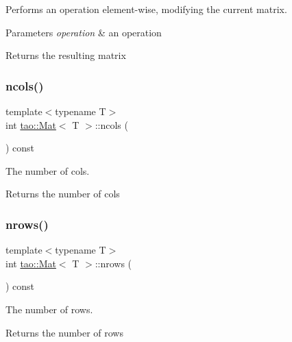 Performs an operation element-\/wise, modifying the current matrix. 


\begin{DoxyParams}{Parameters}
{\em operation} & an operation \\
\hline
\end{DoxyParams}
\begin{DoxyReturn}{Returns}
the resulting matrix 
\end{DoxyReturn}
\mbox{\label{classtao_1_1_mat_ae13a111423bb288f81a3c2ff132955f7}} 
\subsubsection{\texorpdfstring{ncols()}{ncols()}}
{\footnotesize\ttfamily template$<$typename T$>$ \\
int \mbox{\hyperlink{classtao_1_1_mat}{tao\+::\+Mat}}$<$ T $>$\+::ncols (\begin{DoxyParamCaption}{ }\end{DoxyParamCaption}) const\hspace{0.3cm}{\ttfamily [inline]}}



The number of cols. 

\begin{DoxyReturn}{Returns}
the number of cols 
\end{DoxyReturn}
\mbox{\label{classtao_1_1_mat_a6391b9b7e8b36ceeb341e8bd94952d5c}} 
\subsubsection{\texorpdfstring{nrows()}{nrows()}}
{\footnotesize\ttfamily template$<$typename T$>$ \\
int \mbox{\hyperlink{classtao_1_1_mat}{tao\+::\+Mat}}$<$ T $>$\+::nrows (\begin{DoxyParamCaption}{ }\end{DoxyParamCaption}) const\hspace{0.3cm}{\ttfamily [inline]}}



The number of rows. 

\begin{DoxyReturn}{Returns}
the number of rows 
\end{DoxyReturn}
\mbox{\label{classtao_1_1_mat_ad328f559aab180d67e0fb4558c6c92a0}} 
